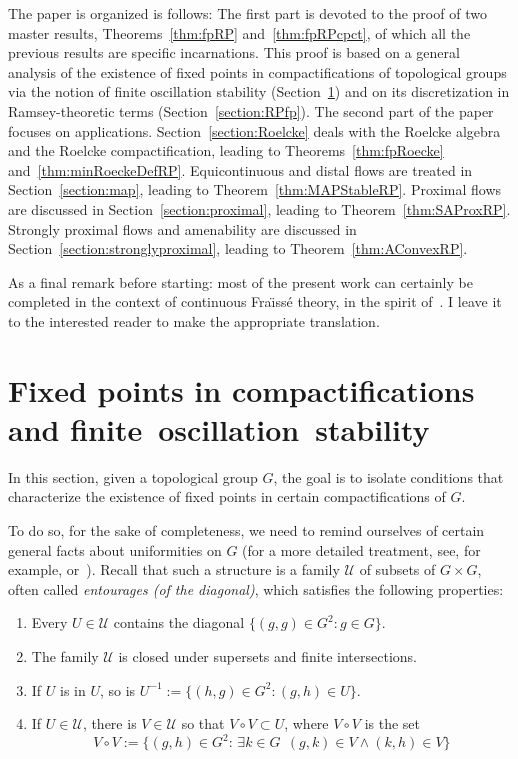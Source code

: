The paper is organized is follows: The first part is devoted to the proof of two master results, Theorems~\ref{thm:fpRP} and~\ref{thm:fpRPcpct}, of which all the previous results are specific incarnations. This proof is based on a general analysis of the existence of fixed points in compactifications of topological groups via the notion of finite oscillation stability (Section~\ref{section:oscillationstability}) and on its discretization in Ramsey-theoretic terms (Section~\ref{section:RPfp}). The second part of the paper focuses on applications. Section~\ref{section:Roelcke} deals with the Roelcke algebra and the Roelcke compactification, leading to Theorems~\ref{thm:fpRoecke} and~\ref{thm:minRoeckeDefRP}. Equicontinuous and distal flows are treated in Section~\ref{section:map}, leading to Theorem~\ref{thm:MAPStableRP}. Proximal flows are discussed in Section~\ref{section:proximal}, leading to Theorem~\ref{thm:SAProxRP}. Strongly proximal flows and amenability are discussed in Section~\ref{section:stronglyproximal}, leading to Theorem~\ref{thm:AConvexRP}.

As a final remark before starting: most of the present work can certainly be completed in the context of continuous Fra\"{\i}ss\'e theory, in the spirit of~\cite{MT}. I leave it to the interested reader to make the appropriate translation.


\section{Fixed points in compactifications and finite~oscillation~stability}
\label{section:oscillationstability}

In this section, given a topological group $G$, the goal is to isolate conditions that characterize the existence of fixed points in certain compactifications of $G$.

To do so, for the sake of completeness, we need to remind ourselves of certain general facts about uniformities on $G$ (for a more detailed treatment, see, for example, \cite{Bou} or~\cite{Eng}). Recall that such a structure is a family $\mathcal U$ of subsets of $G\times G$, often called \emph{entourages (of the diagonal)}, which satisfies the following properties:
\begin{enumerate}
\item Every $U\in \mathcal U$ contains the diagonal $\{ (g,g) \in G^{2}: g\in G \}$.
\item The family $\mathcal U$ is closed under supersets and finite intersections.
\item If $U$ is in $U$, so is $U^{-1}:=\{ (h,g) \in G^{2}: (g,h)\in U \}$.
\item If $U\in \mathcal U$, there is $V\in \mathcal U$ so that $V\circ V \subset U$, where $V\circ V$ is the set
\[
V\circ V:=\{ (g,h) \in G^{2}:\, \exists k \in G \ \ (g,k)\in V \wedge (k,h)\in V\}
\]
\end{enumerate}

